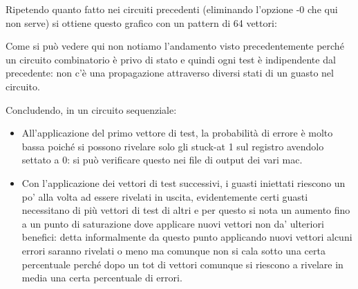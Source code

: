 \documentclass[12pt, letterpaper]{article}
\begin{document}
Ripetendo quanto fatto nei circuiti precedenti (eliminando l'opzione -0 che qui non serve) si ottiene questo grafico con un pattern di 64 vettori:



Come si può vedere qui non notiamo l'andamento visto precedentemente perché un circuito combinatorio è privo di stato e quindi ogni test è indipendente dal precedente: non c'è una propagazione attraverso diversi stati di un guasto nel circuito.

Concludendo, in un circuito sequenziale:

\begin{itemize}
\item All'applicazione del primo vettore di test, la probabilità di errore è molto bassa poiché si possono rivelare solo gli stuck-at 1 sul registro avendolo settato a 0: si può verificare questo nei file di output dei vari mac.
\item Con l'applicazione dei vettori di test successivi, i guasti iniettati riescono un po' alla volta ad essere rivelati in uscita, evidentemente certi guasti necessitano di più vettori di test di altri e per questo si nota un aumento fino a un punto di saturazione dove applicare nuovi vettori non da' ulteriori benefici: detta informalmente da questo punto applicando nuovi vettori alcuni errori saranno rivelati o meno ma comunque non si cala sotto una certa percentuale perché dopo un tot di vettori comunque si riescono a rivelare in media una certa percentuale di errori.
\end{itemize}
\end{document}
